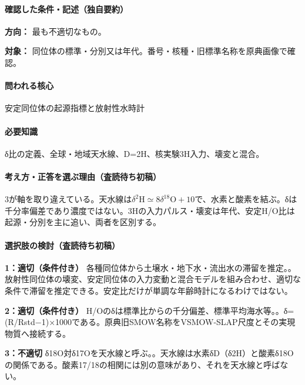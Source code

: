 \paragraph{確認した条件・記述（独自要約）}\mbox{}\par

\noindent\textbf{方向：} 最も不適切なもの。\par

\noindent\textbf{対象：} 同位体の標準・分別又は年代。番号・核種・旧標準名称を原典画像で確認。\par

\paragraph{問われる核心} 安定同位体の起源指標と放射性水時計

\paragraph{必要知識} δ比の定義、全球・地域天水線、D=\allowbreak{}2H、核実験3H入力、壊変と混合。

\paragraph{考え方・正答を選ぶ理由（査読待ち初稿）} 3が軸を取り違えている。天水線は\(\delta^2\mathrm H\simeq8\delta^{18}\mathrm O+10\)で、水素と酸素を結ぶ。δは千分率偏差であり濃度ではない。3Hの入力パルス・壊変は年代、安定H/O比は起源・分別を主に追い、両者を区別する。

\paragraph{選択肢の検討（査読待ち初稿）}\mbox{}\par

\noindent\textbf{1：適切（条件付き）} 各種同位体から土壌水・地下水・流出水の滞留を推定。。放射性同位体の壊変、安定同位体の入力変動と混合モデルを組み合わせ、適切な条件で滞留を推定できる。安定比だけが単調な年齢時計になるわけではない。\par

\noindent\textbf{2：適切（条件付き）} H/Oのδは標準比からの千分偏差、標準平均海水等。。δ=(R/Rstd−1)×1000である。原典旧SMOW名称をVSMOW-SLAP尺度とその実現物質へ接続する。\par

\noindent\textbf{3：不適切} δ18O対δ17Oを天水線と呼ぶ。。天水線は水素δD（δ2H）と酸素δ18Oの関係である。酸素17/18の相関には別の意味があり、それを天水線と呼ばない。\par

